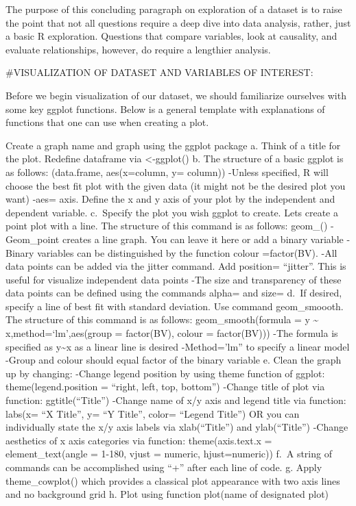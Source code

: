 \documentclass[
]{article}
\begin{document}
The purpose of this concluding paragraph on exploration of a dataset is
to raise the point that not all questions require a deep dive into data
analysis, rather, just a basic R exploration. Questions that compare
variables, look at causality, and evaluate relationships, however, do
require a lengthier analysis.

\#VISUALIZATION OF DATASET AND VARIABLES OF INTEREST:

Before we begin visualization of our dataset, we should familiarize
ourselves with some key ggplot functions. Below is a general template
with explanations of functions that one can use when creating a plot.

Create a graph name and graph using the ggplot package a. Think of a
title for the plot. Redefine dataframe via \textless-ggplot() b. The
structure of a basic ggplot is as follows: (data.frame, aes(x=column, y=
column)) -Unless specified, R will choose the best fit plot with the
given data (it might not be the desired plot you want) -aes= axis.
Define the x and y axis of your plot by the independent and dependent
variable. c.~Specify the plot you wish ggplot to create. Lets create a
point plot with a line. The structure of this command is as follows:
geom\_() -Geom\_point creates a line graph. You can leave it here or add
a binary variable -Binary variables can be distinguished by the function
colour =factor(BV). -All data points can be added via the jitter
command. Add position= ``jitter''. This is useful for visualize
independent data points -The size and transparency of these data points
can be defined using the commands alpha= and size= d.~If desired,
specify a line of best fit with standard deviation. Use command
geom\_smoooth. The structure of this command is as follows:
geom\_smooth(formula = y \textasciitilde{} x,method=`lm',aes(group =
factor(BV), colour = factor(BV))) -The formula is specified as
y\textasciitilde x as a linear line is desired -Method='lm'' to specify
a linear model -Group and colour should equal factor of the binary
variable e. Clean the graph up by changing: -Change legend position by
using theme function of ggplot: theme(legend.position = ``right, left,
top, bottom'') -Change title of plot via function: ggtitle(``Title'')
-Change name of x/y axis and legend title via function: labs(x= ``X
Title'', y= ``Y Title'', color= ``Legend Title'') OR you can
individually state the x/y axis labels via xlab(``Title'') and
ylab(``Title'') -Change aesthetics of x axis categories via function:
theme(axis.text.x = element\_text(angle = 1-180, vjust = numeric,
hjust=numeric)) f.~A string of commands can be accomplished using ``+''
after each line of code. g. Apply theme\_cowplot() which provides a
classical plot appearance with two axis lines and no background grid h.
Plot using function plot(name of designated plot)
\end{document}
